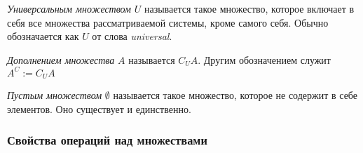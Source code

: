 \begin{definition}
    \textit{Универсальным множеством} $U$ называется такое множество, которое включает в себя все множества рассматриваемой системы, кроме самого себя. Обычно обозначается как $U$ от слова \textit{universal}.
\end{definition}

\begin{definition}
    \textit{Дополнением множества} $A$ называется $C_U A$. Другим обозначением служит $A^C := C_U A$
\end{definition}

\begin{definition}
    \textit{Пустым множеством} $\emptyset$ называется такое множество, которое не содержит в себе элементов. Оно существует и единственно.
\end{definition}


\subsubsection*{Свойства операций над множествами}


